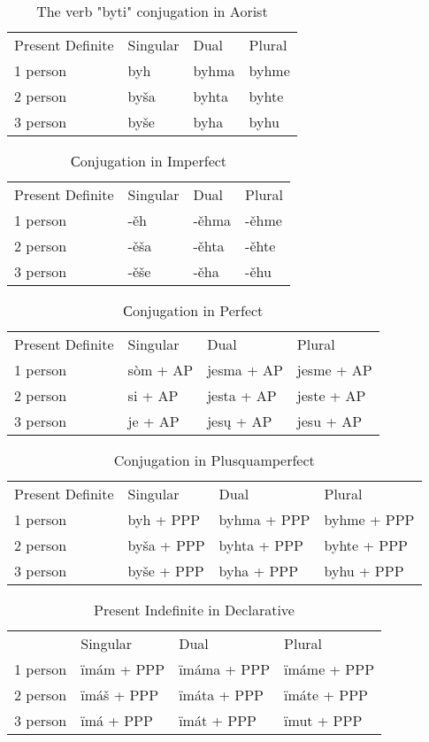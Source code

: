 \begin{table}[!htpb]
	\caption{The verb "byti" conjugation in Aorist}
	\begin{tabular}{llll}
		Present Definite & Singular & Dual & Plural \\
		1 person & byh & byhma & byhme \\
		2 person & byša & byhta & byhte \\
		3 person & byše & byha & byhu 
	\end{tabular}
\end{table}

\begin{table}[!htpb]
	\caption{Сonjugation in Imperfect}
	\begin{tabular}{llll}
		Present Definite & Singular & Dual & Plural \\
		1 person & -ěh & -ěhma & -ěhme \\
		2 person & -ěša & -ěhta & -ěhte \\
		3 person & -ěše & -ěha & -ěhu
	\end{tabular}
\end{table}

\begin{table}[!htpb]
	\caption{Сonjugation in Perfect}
	\begin{tabular}{llll}
		Present Definite & Singular & Dual & Plural \\
		1 person & sòm + AP & jesma + AP & jesme + AP \\
		2 person & si + AP & jesta + AP & jeste  + AP \\
		3 person & je + AP & jesų + AP & jesu + AP 
	\end{tabular}
\end{table}

\begin{table}[!htpb]
	\caption{Conjugation in Plusquamperfect}
	\begin{tabular}{llll}
		Present Definite & Singular & Dual & Plural \\
		1 person & byh + PPP & byhma + PPP & byhme + PPP \\
		2 person & byša + PPP & byhta + PPP & byhte  + PPP \\
		3 person & byše + PPP & byha + PPP & byhu + PPP 
	\end{tabular}
\end{table}



\begin{table}[!htpb]
	\caption{Present Indefinite in Declarative}
	\begin{tabular}{llll}
		 & Singular & Dual & Plural \\
		1 person & ïmám + PPP & ïmáma + PPP & ïmáme + PPP \\
		2 person & ïmáš + PPP & ïmáta + PPP & ïmáte + PPP \\
		3 person & ïmá + PPP & ïmát + PPP & ïmut + PPP
	\end{tabular}
\end{table}

